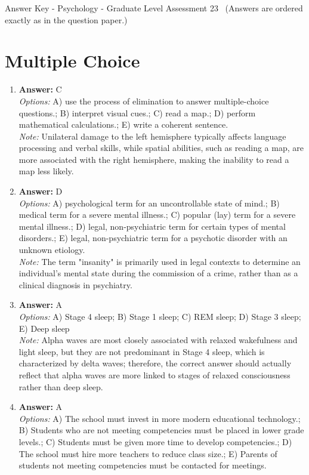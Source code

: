 \documentclass[12pt]{article}
\begin{document}
\begin{center}
Answer Key - Psychology - Graduate Level Assessment 23 \
\small (Answers are ordered exactly as in the question paper.)
\end{center}

\section*{Multiple Choice}
\begin{enumerate}[label=\arabic*.]
\item \textbf{Answer:} C
\\ \textit{Options:} A) use the process of elimination to answer multiple-choice questions.; B) interpret visual cues.; C) read a map.; D) perform mathematical calculations.; E) write a coherent sentence.
\\ \textit{Note:} Unilateral damage to the left hemisphere typically affects language processing and verbal skills, while spatial abilities, such as reading a map, are more associated with the right hemisphere, making the inability to read a map less likely.
\item \textbf{Answer:} D
\\ \textit{Options:} A) psychological term for an uncontrollable state of mind.; B) medical term for a severe mental illness.; C) popular (lay) term for a severe mental illness.; D) legal, non-psychiatric term for certain types of mental disorders.; E) legal, non-psychiatric term for a psychotic disorder with an unknown etiology.
\\ \textit{Note:} The term "insanity" is primarily used in legal contexts to determine an individual's mental state during the commission of a crime, rather than as a clinical diagnosis in psychiatry.
\item \textbf{Answer:} A
\\ \textit{Options:} A) Stage 4 sleep; B) Stage 1 sleep; C) REM sleep; D) Stage 3 sleep; E) Deep sleep
\\ \textit{Note:} Alpha waves are most closely associated with relaxed wakefulness and light sleep, but they are not predominant in Stage 4 sleep, which is characterized by delta waves; therefore, the correct answer should actually reflect that alpha waves are more linked to stages of relaxed consciousness rather than deep sleep.
\item \textbf{Answer:} A
\\ \textit{Options:} A) The school must invest in more modern educational technology.; B) Students who are not meeting competencies must be placed in lower grade levels.; C) Students must be given more time to develop competencies.; D) The school must hire more teachers to reduce class size.; E) Parents of students not meeting competencies must be contacted for meetings.

\end{enumerate}
\end{document}

